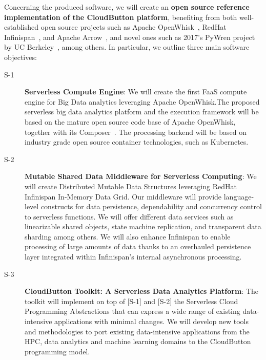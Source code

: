 \documentclass[a4paper,11pt]{article}
\newcommand{\proj}{CloudButton\xspace}
\begin{document}
Concerning the produced software, we will create an \textbf{open source reference implementation of the \proj platform}, benefiting from both well-established open source projects such as Apache OpenWhisk~\cite{openwhisk}, RedHat Infinispan~\cite{infinispan},  and Apache Arrow~\cite{arrow}, and novel ones such as 2017's PyWren project by UC Berkeley~\cite{PyWren2017}, among others. In particular, we outline three main software objectives:

\begin{description}

\item [S-1] \textbf{Serverless Compute Engine}: We will create the first FaaS compute engine  for Big Data analytics leveraging Apache OpenWhisk.The proposed serverless big data analytics platform and the execution framework will be based on the mature open source code base of Apache OpenWhisk, together with its Composer~\cite{composer}. The processing backend will be based on industry grade open source container technologies, such as Kubernetes.
 \newpage

\item [S-2] \textbf{Mutable Shared Data Middleware for Serverless Computing}: We will create Distributed Mutable Data Structures leveraging RedHat Infinispan In-Memory Data Grid. Our middleware will provide  language-level constructs for data persistence, dependability and concurrency control to serverless functions.  We will offer different data services such as linearizable shared objects, state machine replication, and transparent data sharding among others. We will also enhance Infinispan to enable processing of large amounts of data thanks to an overhauled persistence layer integrated within Infinispan’s internal asynchronous processing.
 
\item [S-3] \textbf{\proj Toolkit: A Serverless Data Analytics Platform}:  The toolkit will implement on top of [S-1] and [S-2] the  Serverless Cloud Programming Abstractions that can express a wide range of  existing data-intensive applications with minimal changes. We will  develop new tools and methodologies to port existing   data-intensive applications from the HPC, data analytics and machine learning  domains to the \proj programming model. 

\end{description}
  \bigskip
	
\end{document}
